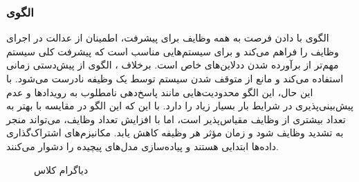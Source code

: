 \subsubsection{الگوی }
\label{archConRoundRobSec}
\begin{RTL}
الگوی  \cite{ref4} با
دادن فرصت به همه وظایف برای پیشرفت،
اطمینان از عدالت در اجرای وظایف را فراهم می‌کند و برای سیستم‌هایی مناسب
است که پیشرفت کلی سیستم مهم‌تر از برآورده شدن ددلاین‌های خاص است.
برخلاف ، الگوی
 از پیش‌دستی زمانی
استفاده می‌کند و مانع از متوقف شدن سیستم توسط یک وظیفه
نادرست می‌شود. با این حال، این الگو محدودیت‌هایی مانند پاسخ‌دهی
نامطلوب به رویدادها و عدم پیش‌بینی‌پذیری در شرایط بار بسیار زیاد
را دارد. با این که این الگو در مقایسه با 
بهتر به تعداد بیشتری از
وظایف مقیاس‌پذیر است، اما با افزایش تعداد وظایف، می‌تواند منجر به تشدید وظایف شود
و زمان مؤثر هر وظیفه کاهش یابد. مکانیزم‌های اشتراک‌گذاری داده‌ها ابتدایی هستند
و پیاده‌سازی مدل‌های پیچیده را دشوار می‌کنند.
\end{RTL}
\begin{figure}[h!]
\centering
{}
\caption{دیاگرام کلاس }
\label{archConRoundRobClassDiag}
\end{figure}